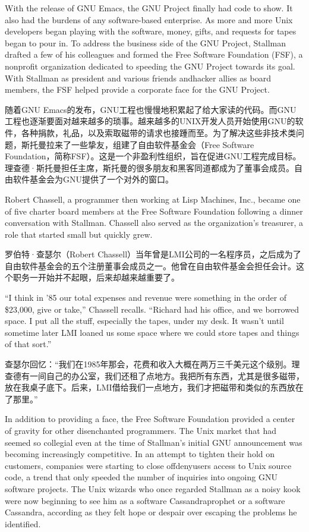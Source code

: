 \ifdefined\eng
With the release of GNU Emacs, the GNU Project finally had code to show. It also had the burdens of any software-based enterprise. As more and more Unix developers began playing with the software, money, gifts, and requests for tapes began to pour in. To address the business side of the GNU Project, Stallman drafted a few of his colleagues and formed the Free Software Foundation (FSF), a nonprofit organization dedicated to speeding the GNU Project towards its goal. With Stallman as president and various \ifdefined\vtwo friends and\fi hacker allies as board members, the FSF helped provide a corporate face for the GNU Project.
\fi

\ifdefined\chs
随着GNU Emacs的发布，GNU工程也慢慢地积累起了给大家读的代码。而GNU工程也逐渐要面对越来越多的琐事。越来越多的UNIX开发人员开始使用GNU的软件，各种捐款，礼品，以及索取磁带的请求也接踵而至。为了解决这些非技术类问题，斯托曼拉来了一些挚友，组建了自由软件基金会（Free Software Foundation，简称FSF）。这是一个非盈利性组织，旨在促进GNU工程完成目标。理查德·斯托曼担任主席，斯托曼的很多朋友和黑客同道都成为了董事会成员。自由软件基金会为GNU提供了一个对外的窗口。
\fi

\ifdefined\eng
Robert Chassell, a programmer then working at Lisp Machines, Inc., became one of five charter board members at the Free Software Foundation following a dinner conversation with Stallman. Chassell also served as the organization's treasurer, a role that started small but quickly grew.
\fi

\ifdefined\chs
罗伯特·查瑟尔（Robert Chassell）当年曾是LMI公司的一名程序员，之后成为了自由软件基金会的五个注册董事会成员之一。他曾在自由软件基金会担任会计。这个职务一开始并不起眼，后来却越来越重要了。
\fi

\ifdefined\eng
``I think in '85 our total expenses and revenue were something in the order of \$23,000, give or take,'' Chassell recalls. ``Richard had his office, and we borrowed space. I put all the stuff, especially the tapes, under my desk. It wasn't until sometime later LMI loaned us some space where we could store tapes and things of that sort.''
\fi

\ifdefined\chs
查瑟尔回忆：``我们在1985年那会，花费和收入大概在两万三千美元这个级别。理查德有一间自己的办公室，我们还租了点地方。我把所有东西，尤其是很多磁带，放在我桌子底下。后来，LMI借给我们一点地方，我们才把磁带和类似的东西放在了那里。''
\fi

\ifdefined\eng
In addition to providing a face, the Free Software Foundation provided a center of gravity for other disenchanted programmers. The Unix market that had seemed so collegial even at the time of Stallman's initial GNU announcement was becoming increasingly competitive. In an attempt to tighten their hold on customers, companies were starting to \ifdefined\vone close off\fi\ifdefined\vtwo deny\fi users access to Unix source code, a trend that only speeded the number of inquiries into ongoing GNU software projects. The Unix wizards who once regarded Stallman as a noisy kook were now beginning to see him as a software \ifdefined\vone Cassandra\fi\ifdefined\vtwo prophet or a software Cassandra, according as they felt hope or despair over escaping the problems he identified\fi.
\fi

